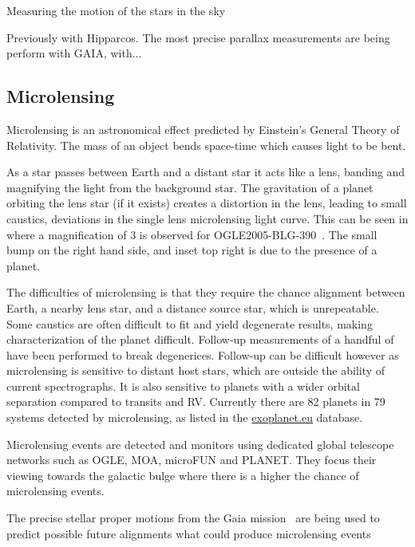 Measuring the motion of the stars in the sky

Previously with Hipparcos.
The most precise parallax measurements are being perform with GAIA, with...


\subsection{Microlensing}

Microlensing is an astronomical effect predicted by Einstein's General Theory of Relativity. The mass of an object bends space-time which causes light to be bent.

As a star passes between Earth and a distant star it acts like a lens, banding and magnifying the light from the background star. The gravitation of a planet orbiting the lens star (if it exists) creates a distortion in the lens, leading to small caustics, deviations in the single lens microlensing light curve. This can be seen in  where a  magnification of 3 is observed for OGLE2005-BLG-390~\citep{beaulieu_discovery_2006}. The small bump on the right hand side, and inset top right is due to the presence of a planet.

The difficulties of microlensing is that they require the chance alignment between Earth, a nearby lens star, and a distance source star, which is unrepeatable. Some caustics are often difficult to fit and yield degenerate results, making characterization of the planet difficult. Follow-up measurements of a handful of have been performed\citep[e.g.][]{kubas 2012, batista 2015, santerne_spectroscopic_2016}  to break degenerices. 
Follow-up can be difficult however as microlensing is sensitive to distant host stars, which are outside the ability of current spectrographs. It is also sensitive to planets with a wider orbital separation  compared to transits and RV. Currently there are 82 planets in 79 systems detected by microlensing, as listed in the \href{https:\\www.exoplanet.eu}{exoplanet.eu} database.

Microlensing events are detected and monitors using dedicated global telescope networks such as OGLE, MOA, microFUN and PLANET. They focus their viewing towards the galactic bulge where there is a higher the chance of microlensing events.

The precise stellar proper motions from the Gaia mission~\citep{collaboration_gaia_2016} are being used to predict possible future alignments what could produce microlensing events \citep{kluter_prediction_2018} 

